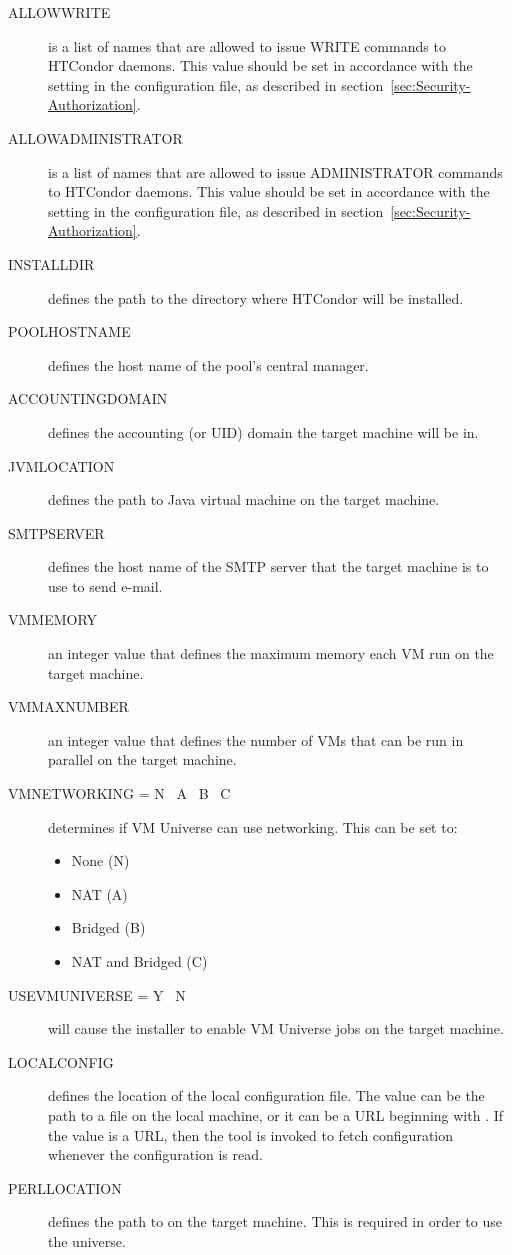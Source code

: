 \begin{description}
\item[ALLOWWRITE]
is a list of names that are allowed to issue WRITE commands to
HTCondor daemons. This value should be set in accordance with the
 setting in the configuration file, as described in
section~\ref{sec:Security-Authorization}.

\item[ALLOWADMINISTRATOR]
is a list of names that are allowed to issue ADMINISTRATOR commands to
HTCondor daemons. This value should be set in accordance with the
 setting in the configuration file, 
as described in
section~\ref{sec:Security-Authorization}.

\item[INSTALLDIR]
defines the path to the directory where HTCondor will be installed. 

\item[POOLHOSTNAME]
defines the host name of the pool's central manager. 

\item[ACCOUNTINGDOMAIN] 
defines the accounting (or UID) domain the target machine will be in.

\item[JVMLOCATION]
defines the path to Java virtual machine on the target machine.

\item[SMTPSERVER]
defines the host name of the SMTP server that the target machine is to
use to send e-mail.

\item [VMMEMORY]
an integer value that defines the maximum memory each VM run on the target
machine.

\item [VMMAXNUMBER]
an integer value that defines the number of VMs that can be run in parallel
on the target machine.

\item [VMNETWORKING = \lt{} N \Bar{}\ A \Bar{}\ B \Bar{}\ C \gt{}]
determines if VM Universe can use networking. This can be set to:
\begin{itemize}
\item None (N)
\item NAT (A)
\item Bridged (B)
\item NAT and Bridged (C)
\end{itemize}

\item [USEVMUNIVERSE = \lt{} Y \Bar{}\ N \gt{}]
will cause the installer to enable VM Universe jobs on the target machine.

\item[LOCALCONFIG]
defines the location of the local configuration file.
The value can be the path to a file on the local machine, 
or it can be a URL beginning with .
If the value is a URL, 
then the  tool is invoked to fetch configuration
whenever the configuration is read.

\item[PERLLOCATION]
defines the path to  on the target machine. This is required in
order to use the  universe.
\end{description}


